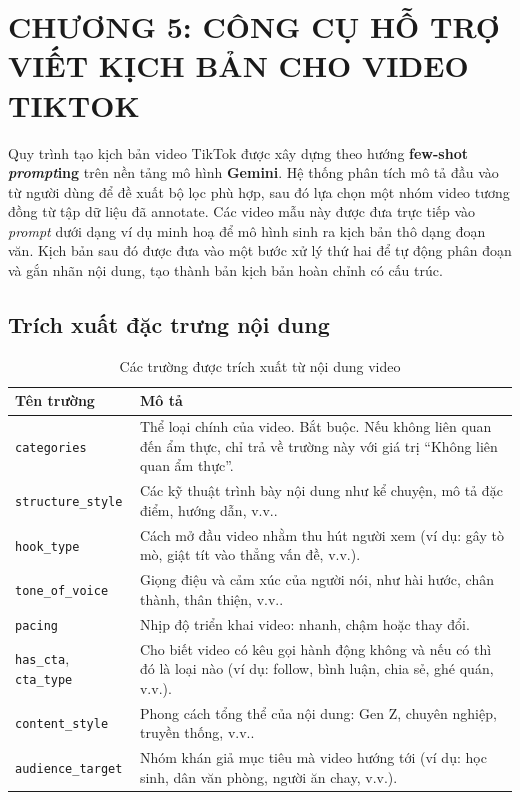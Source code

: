 \section{CHƯƠNG 5: CÔNG CỤ HỖ TRỢ VIẾT KỊCH BẢN CHO VIDEO TIKTOK} \label{sec:scriptwriting}

Quy trình tạo kịch bản video TikTok được xây dựng theo hướng \textbf{few-shot \textit{prompt}ing} trên nền tảng mô hình \textbf{Gemini}. Hệ thống phân tích mô tả đầu vào từ người dùng để đề xuất bộ lọc phù hợp, sau đó lựa chọn một nhóm video tương đồng từ tập dữ liệu đã annotate. Các video mẫu này được đưa trực tiếp vào \textit{prompt} dưới dạng ví dụ minh hoạ để mô hình sinh ra kịch bản thô dạng đoạn văn. Kịch bản sau đó được đưa vào một bước xử lý thứ hai để tự động phân đoạn và gắn nhãn nội dung, tạo thành bản kịch bản hoàn chỉnh có cấu trúc.

\subsection{Trích xuất đặc trưng nội dung}

\begin{table}[ht]
\centering
\footnotesize
\renewcommand{\arraystretch}{1.4}
\begin{tabular}{|>{\arraybackslash}m{3.5cm}|p{12.5cm}|}
\hline
\textbf{Tên trường} & \textbf{Mô tả} \\
\hline
\texttt{categories} & Thể loại chính của video. Bắt buộc. Nếu không liên quan đến ẩm thực, chỉ trả về trường này với giá trị ``Không liên quan ẩm thực''. \\
\hline
\texttt{structure\_style} & Các kỹ thuật trình bày nội dung như kể chuyện, mô tả đặc điểm, hướng dẫn, v.v.. \\
\hline
\texttt{hook\_type} & Cách mở đầu video nhằm thu hút người xem (ví dụ: gây tò mò, giật tít vào thẳng vấn đề, v.v.). \\
\hline
\texttt{tone\_of\_voice} & Giọng điệu và cảm xúc của người nói, như hài hước, chân thành, thân thiện, v.v.. \\
\hline
\texttt{pacing} & Nhịp độ triển khai video: nhanh, chậm hoặc thay đổi. \\
\hline
\texttt{has\_cta}, \texttt{cta\_type} & Cho biết video có kêu gọi hành động không và nếu có thì đó là loại nào (ví dụ: follow, bình luận, chia sẻ, ghé quán, v.v.). \\
\hline
\texttt{content\_style} & Phong cách tổng thể của nội dung: Gen Z, chuyên nghiệp, truyền thống, v.v.. \\
\hline
\texttt{audience\_target} & Nhóm khán giả mục tiêu mà video hướng tới (ví dụ: học sinh, dân văn phòng, người ăn chay, v.v.). \\
\hline
\end{tabular}
\caption{Các trường được trích xuất từ nội dung video}
\label{tab:extraction_fields}
\end{table}

